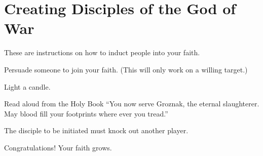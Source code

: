 \documentclass[green]{guildcamp2}
\begin{document}
\name{\gBaptism{}}

\section{Creating Disciples of the God of War}
These are instructions on how to induct people into your faith.

\begin{enum}[Requirements]
	\item {\iHolyBook{}}
	\item {\iCFungus{}}
	\item {\iCandle{}}
\end{enum}

\begin{enum}[Directions]
	\item Persuade someone to join your faith. (This will only work on a willing target.)
	\item Light a candle.
	\item Read aloud from the Holy Book ``You now serve Groznak, the eternal slaughterer. May blood fill your footprints where ever you tread.''
	\item The disciple to be initiated must knock out another player.
\end{enum}
	
Congratulations! Your faith grows.
\end{document}
